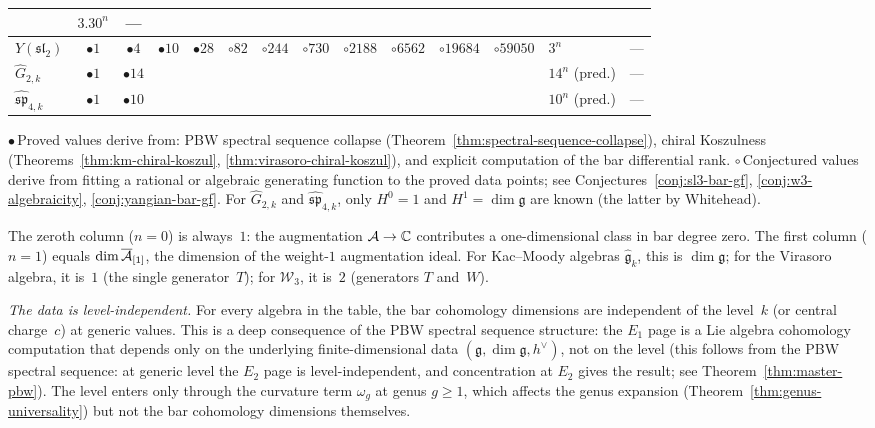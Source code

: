 \begin{table}[ht]
{\begin{tabular}{|l|ccccccccccc|l|l|}
  & $3.30^n$ & --- \\
\hline
$Y(\mathfrak{sl}_2)$
  & $\bullet 1$ & $\bullet 4$ & $\bullet 10$ & $\bullet 28$ & $\circ 82$ & $\circ 244$ & $\circ 730$ & $\circ 2188$ & $\circ 6562$ & $\circ 19684$ & $\circ 59050$
  & $3^n$ & --- \\
\hline
$\widehat{G}_{2,k}$
  & $\bullet 1$ & $\bullet 14$ & & & & & & & & &
  & $14^n$ (pred.) & --- \\
\hline
$\widehat{\mathfrak{sp}}_{4,k}$
  & $\bullet 1$ & $\bullet 10$ & & & & & & & & &
  & $10^n$ (pred.) & --- \\
\hline
\end{tabular}
}

\medskip
\noindent
{\footnotesize
$\bullet$\,Proved values derive from:
PBW spectral sequence collapse (Theorem~\ref{thm:spectral-sequence-collapse}),
chiral Koszulness (Theorems~\ref{thm:km-chiral-koszul},
\ref{thm:virasoro-chiral-koszul}),
and explicit computation of the bar differential rank.
$\circ$\,Conjectured values derive from fitting a rational or algebraic
generating function to the proved data points; see
Conjectures~\ref{conj:sl3-bar-gf}, \ref{conj:w3-algebraicity},
\ref{conj:yangian-bar-gf}.
For $\widehat{G}_{2,k}$ and $\widehat{\mathfrak{sp}}_{4,k}$,
only $H^0 = 1$ and $H^1 = \dim\mathfrak{g}$ are known
(the latter by Whitehead).
}
\end{table}

\begin{remark}
\label{rem:reading-frontier-table}
The zeroth column ($n=0$) is always~$1$: the augmentation $\mathcal{A} \to \mathbb{C}$ contributes a one-dimensional class in bar degree zero.  The first column ($n=1$) equals $\dim\overline{\mathcal{A}}_{[1]}$, the dimension of the weight-$1$ augmentation ideal.  For Kac--Moody algebras $\widehat{\mathfrak{g}}_k$, this is $\dim\mathfrak{g}$; for the Virasoro algebra, it is~$1$ (the single generator~$T$); for $\mathcal{W}_3$, it is~$2$ (generators $T$ and~$W$).

\emph{The data is level-independent.}  For every algebra in the table, the bar cohomology dimensions are independent of the level~$k$ (or central charge~$c$) at generic values.  This is a deep consequence of the PBW spectral sequence structure: the $E_1$ page is a Lie algebra cohomology computation that depends only on the underlying finite-dimensional data $(\mathfrak{g}, \dim\mathfrak{g}, h^\vee)$, not on the level (this follows from the PBW spectral sequence: at generic level the $E_2$ page is level-independent, and concentration at $E_2$ gives the result; see Theorem~\ref{thm:master-pbw}).  The level enters only through the curvature term $\omega_g$ at genus $g \geq 1$, which affects the genus expansion (Theorem~\ref{thm:genus-universality}) but not the bar cohomology dimensions themselves.
\end{remark}

